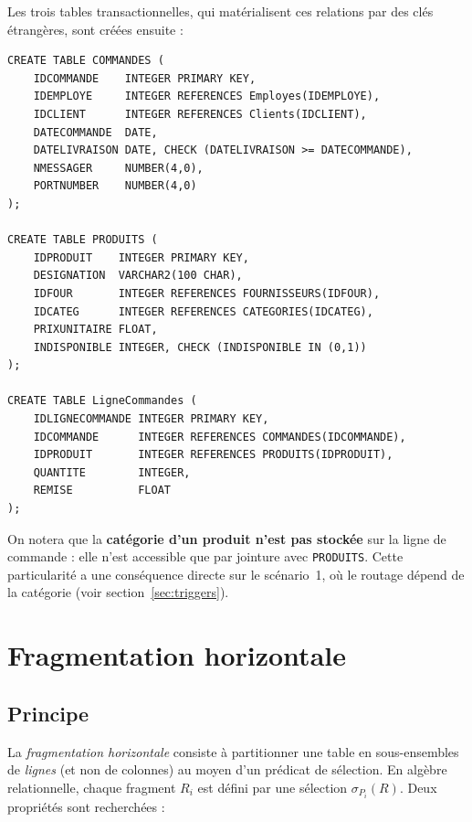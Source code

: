 \documentclass[11pt,a4paper]{article}
\begin{document}
Les trois tables transactionnelles, qui matérialisent ces relations par des
clés étrangères, sont créées ensuite :

\begin{lstlisting}[style=sql,caption={Tables transactionnelles du schéma global (extrait de \texttt{02\_create\_table.sql}).},label={lst:schema}]
CREATE TABLE COMMANDES (
    IDCOMMANDE    INTEGER PRIMARY KEY,
    IDEMPLOYE     INTEGER REFERENCES Employes(IDEMPLOYE),
    IDCLIENT      INTEGER REFERENCES Clients(IDCLIENT),
    DATECOMMANDE  DATE,
    DATELIVRAISON DATE, CHECK (DATELIVRAISON >= DATECOMMANDE),
    NMESSAGER     NUMBER(4,0),
    PORTNUMBER    NUMBER(4,0)
);

CREATE TABLE PRODUITS (
    IDPRODUIT    INTEGER PRIMARY KEY,
    DESIGNATION  VARCHAR2(100 CHAR),
    IDFOUR       INTEGER REFERENCES FOURNISSEURS(IDFOUR),
    IDCATEG      INTEGER REFERENCES CATEGORIES(IDCATEG),
    PRIXUNITAIRE FLOAT,
    INDISPONIBLE INTEGER, CHECK (INDISPONIBLE IN (0,1))
);

CREATE TABLE LigneCommandes (
    IDLIGNECOMMANDE INTEGER PRIMARY KEY,
    IDCOMMANDE      INTEGER REFERENCES COMMANDES(IDCOMMANDE),
    IDPRODUIT       INTEGER REFERENCES PRODUITS(IDPRODUIT),
    QUANTITE        INTEGER,
    REMISE          FLOAT
);
\end{lstlisting}

On notera que la \textbf{catégorie d'un produit n'est pas stockée} sur la ligne
de commande : elle n'est accessible que par jointure avec \texttt{PRODUITS}.
Cette particularité a une conséquence directe sur le scénario~1, où le routage
dépend de la catégorie (voir section~\ref{sec:triggers}).

\section{Fragmentation horizontale}
\label{sec:fragmentation}

\subsection{Principe}

La \emph{fragmentation horizontale} consiste à partitionner une table en
sous-ensembles de \emph{lignes} (et non de colonnes) au moyen d'un prédicat de
sélection. En algèbre relationnelle, chaque fragment $R_i$ est défini par une
sélection $\sigma_{P_i}(R)$. Deux propriétés sont recherchées :
\end{document}
